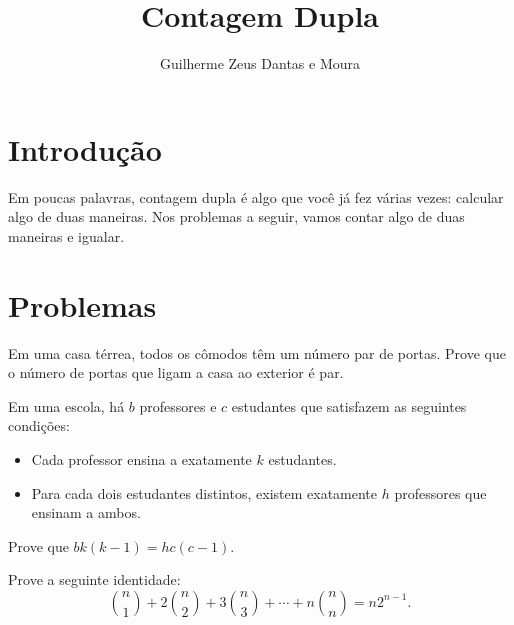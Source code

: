 \documentclass[10pt, a4paper]{article}
\title{Contagem Dupla}
\author{Guilherme Zeus Dantas e Moura}
\begin{document}
	
	\zeustitle

	\section{Introdução}

	Em poucas palavras, contagem dupla é algo que você já fez várias vezes: calcular algo de duas maneiras. Nos problemas a seguir, vamos contar algo de duas maneiras e igualar.

	\section{Problemas}


	\begin{prob} %
		Em uma casa térrea, todos os cômodos têm um número par de portas. Prove que o número de portas que ligam a casa ao exterior é par.	
	\end{prob}

	\begin{prob} %
		Em uma escola, há $b$ professores e $c$ estudantes que satisfazem as seguintes condições:
		
		\begin{itemize}
			\item Cada professor ensina a exatamente $k$ estudantes.
			\item Para cada dois estudantes distintos, existem exatamente $h$ professores que ensinam a ambos.
		\end{itemize}

		Prove que $bk(k-1) = hc(c-1)$.
	\end{prob}

	\begin{prob} %
		Prove a seguinte identidade: \[\binom{n}{1} + 2 \binom{n}{2} + 3 \binom{n}{3} + \cdots + n\binom{n}{n} = n2^{n-1}.\]
	\end{prob}

\end{document}
